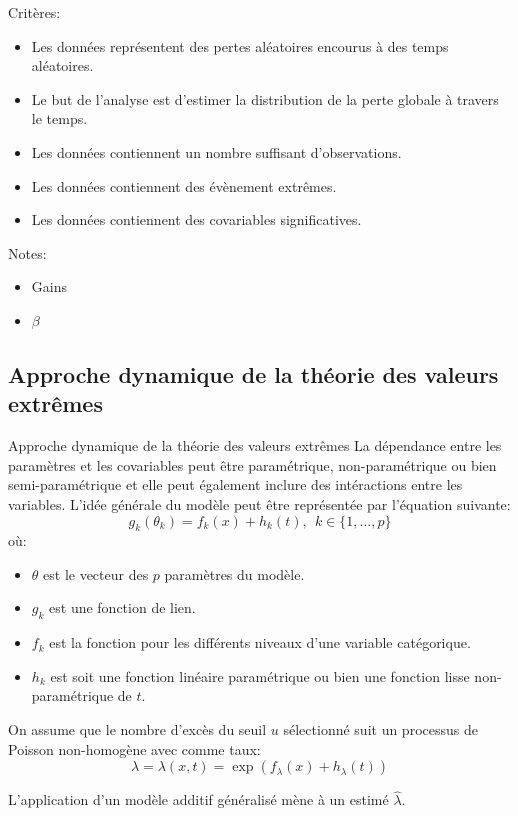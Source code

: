 \documentclass[aspectratio=169, 12pt, french]{beamer}
\begin{document}
\begin{frame}
Critères:
\begin{itemize}
\item Les données représentent des pertes aléatoires encourus à des temps aléatoires.
\item Le but de l'analyse est d'estimer la distribution de la perte globale à travers le temps.
\item Les données contiennent un nombre suffisant d'observations.
\item Les données contiennent des évènement extrêmes.
\item Les données contiennent des covariables significatives.
\end{itemize}
Notes:
\begin{itemize}
\item Gains
\item $\beta$
\end{itemize}
\end{frame}
\subsection{Approche dynamique de la théorie des valeurs extrêmes}
\begin{frame}{Approche dynamique de la théorie des valeurs extrêmes}
La dépendance entre les paramètres et les covariables peut être paramétrique, non-paramétrique ou bien semi-paramétrique et elle peut également inclure des intéractions entre les variables. L'idée générale du modèle peut être représentée par l'équation suivante:
\begin{equation}
g_k(\theta_k) = f_k(x) + h_k(t), \ \ k \in \{1, \dots, p \}
\end{equation}
où:
\begin{itemize}
\item $\theta$ est le vecteur des $p$ paramètres du modèle.
\item $g_k$ est une fonction de lien.
\item $f_k$ est la fonction pour les différents niveaux d'une variable catégorique.
\item $h_k$ est soit une fonction linéaire paramétrique ou bien une fonction lisse non-paramétrique de $t$.
\end{itemize}
\end{frame}


\begin{frame}
On assume que le nombre d'excès du seuil $u$ sélectionné suit un processus de Poisson non-homogène avec comme taux:
 \begin{equation}
 \lambda = \lambda(x, t) = \exp(f_\lambda(x) + h_\lambda(t))
  \end{equation}
  
L'application d'un modèle additif généralisé mène à un estimé $\hat\lambda$.
\end{frame}
\end{document}

